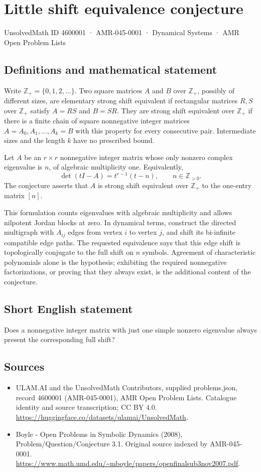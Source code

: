 \documentclass[11pt,a4paper]{article}
\begin{document}
\section*{Little shift equivalence conjecture}\label{4600001}
{\small UnsolvedMath ID 4600001 · AMR-045-0001 · Dynamical Systems · AMR Open Problem Lists}
\subsection{Definitions and mathematical statement}
Write $\mathbb Z_+=\{0,1,2,\ldots\}$. Two square matrices $A$ and $B$ over
$\mathbb Z_+$, possibly of different sizes, are elementary strong shift
equivalent if rectangular matrices $R,S$ over $\mathbb Z_+$ satisfy
$A=RS$ and $B=SR$. They are strong shift equivalent over $\mathbb Z_+$
if there is a finite chain of square nonnegative integer matrices
$A=A_0,A_1,\ldots,A_k=B$ with this property for every consecutive pair.
Intermediate sizes and the length $k$ have no prescribed bound.

Let $A$ be an $r\times r$ nonnegative integer matrix whose only nonzero
complex eigenvalue is $n$, of algebraic multiplicity one. Equivalently,
\[
 \det(tI-A)=t^{r-1}(t-n),\qquad n\in\mathbb Z_{>0}.
\]
The conjecture asserts that $A$ is strong shift equivalent over $\mathbb Z_+$
to the one-entry matrix $[n]$.

This formulation counts eigenvalues with algebraic multiplicity and allows
nilpotent Jordan blocks at zero. In dynamical terms, construct the directed
multigraph with $A_{ij}$ edges from vertex $i$ to vertex $j$, and shift its
bi-infinite compatible edge paths. The requested equivalence says that this
edge shift is topologically conjugate to the full shift on $n$ symbols.
Agreement of characteristic polynomials alone is the hypothesis; exhibiting
the required nonnegative factorizations, or proving that they always exist,
is the additional content of the conjecture.
\subsection{Short English statement}
Does a nonnegative integer matrix with just one simple nonzero eigenvalue always present the corresponding full shift?
\subsection{Sources}
\begin{itemize}
\item[S1] ULAM.AI and the UnsolvedMath Contributors, supplied problems.json, record 4600001 (AMR-045-0001), AMR Open Problem Lists. Catalogue identity and source transcription; CC BY 4.0.
\url{https://huggingface.co/datasets/ulamai/UnsolvedMath}.
\item[S2] Boyle - Open Problems in Symbolic Dynamics (2008), Problem/Question/Conjecture 3.1. Original source indexed by AMR-045-0001.
\url{https://www.math.umd.edu/~mboyle/papers/openfinalsub3nov2007.pdf}.
\end{itemize}
\end{document}
